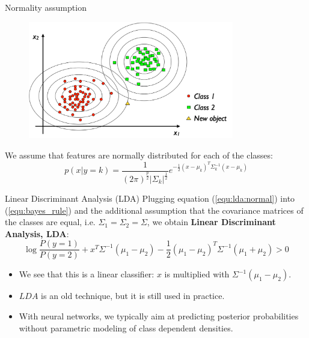 \documentclass[xcolor=pdftex,dvipsnames,table]{beamer}
\begin{document}


\begin{frame}{Normality assumption}
\begin{figure}[htb]
\includegraphics[width=0.8\textwidth]{../graphics/LDA3.pdf}
\end{figure}
We assume that features are normally distributed for each of the classes:
\begin{equation}\label{equ:lda:normal}
p(x|y=k)=\frac{1}{(2\pi)^{\frac{p}{2}}|\Sigma_k|^{\frac{1}{2}}}e^{-\frac{1}{2}(x-\mu_k)^T\Sigma_k^{-1}(x-\mu_k)}
\end{equation}
\end{frame}

\begin{frame}{Linear Discriminant Analysis (LDA)}
Plugging equation (\ref{equ:lda:normal}) into (\ref{equ:bayes_rule}) and the additional assumption that the covariance matrices of the classes are equal, i.e. $\Sigma_1 = \Sigma_2 = \Sigma$, we obtain {\bf Linear Discriminant Analysis, LDA}:
\begin{equation*}
\log{\frac{P(y=1)}{P(y=2)}} + x^T\Sigma^{-1}(\mu_1-\mu_2) - \frac{1}{2}(\mu_1-\mu_2)^T\Sigma^{-1}(\mu_1+\mu_2) > 0
\end{equation*}
\begin{itemize}
	\item We see that this is a linear classifier: $x$ is multiplied with $\Sigma^{-1}(\mu_1-\mu_2)$. 
	\item $LDA$ is an old technique, but it is still used in practice. 
	\item With neural networks, we typically aim at predicting posterior probabilities without parametric modeling of class dependent densities. 
\end{itemize}
\end{frame}
\end{document}

